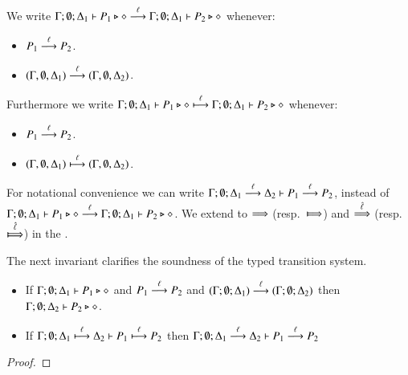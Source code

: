 \begin{definition}\rm
	We write
	$\Gamma; \emptyset; \Delta_1 \vdash P_1 \triangleright \diamond \stackrel{\ell}{\longrightarrow} \Gamma; \emptyset; \Delta_1 \vdash P_2 \triangleright \diamond$
	whenever:
%
	\begin{itemize}
		\item	$P_1 \stackrel{\ell}{\longrightarrow} P_2$.
		\item	$(\Gamma, \emptyset, \Delta_1) \stackrel{\ell}{\longrightarrow} (\Gamma, \emptyset, \Delta_2)$.
	\end{itemize}
%

	Furthermore we write
	$\Gamma; \emptyset; \Delta_1 \vdash P_1 \triangleright \diamond \stackrel{\ell}{\longmapsto} \Gamma; \emptyset; \Delta_1 \vdash P_2 \triangleright \diamond$
	whenever:
%
	\begin{itemize}
		\item	$P_1 \stackrel{\ell}{\longrightarrow} P_2$.
		\item	$(\Gamma, \emptyset, \Delta_1) \stackrel{\ell}{\longmapsto} (\Gamma, \emptyset, \Delta_2)$.
	\end{itemize}
%
\end{definition}

For notational convenience we can write
$\Gamma; \emptyset; \Delta_1 \stackrel{\ell}{\longrightarrow} \Delta_2 \vdash P_1 \stackrel{\ell}{\longrightarrow} P_2$,
instead of $\Gamma; \emptyset; \Delta_1 \vdash P_1 \triangleright \diamond \stackrel{\ell}{\longrightarrow} \Gamma; \emptyset; \Delta_1 \vdash P_2 \triangleright \diamond$.
We extend to $\stackrel{}{\Longrightarrow}$ (resp.\ $\Hby{}$) and $\stackrel{\hat{\ell}}{\Longrightarrow}$ (resp.\ $\Hby{\hat{\ell}}$) in the .

The next invariant clarifies the soundness of the
typed transition system.

\begin{lemma}[Invariant]
	\begin{itemize}
		\item	If $\Gamma; \emptyset; \Delta_1 \vdash P_1 \triangleright \diamond$ and
			$P_1 \stackrel{\ell}{\longrightarrow} P_2$ and $(\Gamma; \emptyset; \Delta_1) \stackrel{\ell}{\longrightarrow} (\Gamma; \emptyset; \Delta_2)$
			then $\Gamma; \emptyset; \Delta_2 \vdash P_2 \triangleright \diamond$.
		\item	If $\Gamma; \emptyset; \Delta_1 \stackrel{\ell}{\longmapsto} \Delta_2 \vdash P_1 \stackrel{\ell}{\longmapsto} P_2$
			then $\Gamma; \emptyset; \Delta_1 \stackrel{\ell}{\longrightarrow} \Delta_2 \vdash P_1 \stackrel{\ell}{\longrightarrow} P_2$

	\end{itemize}
\end{lemma}

\begin{proof}
\end{proof}

